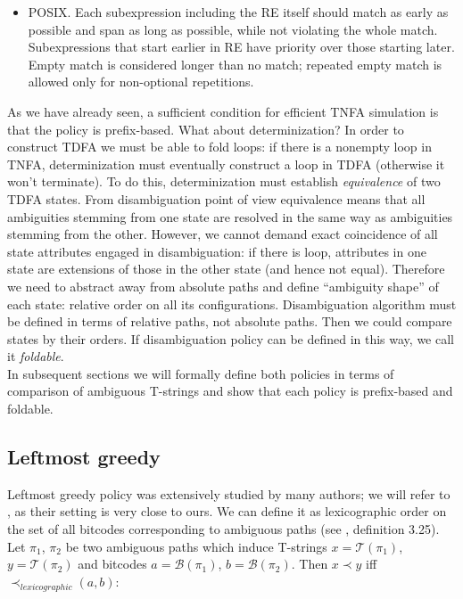\documentclass{article}
\newcommand{\Xeq}{\!=\!}
\newcommand{\XB}{\mathcal{B}}
\newcommand{\XT}{\mathcal{T}}
\theoremstyle{definition}
\begin{document}
\begin{multicols}{2}
\begin{itemize}
    \item POSIX.
        Each subexpression including the RE itself should match as early as possible
        and span as long as possible, while not violating the whole match.
        Subexpressions that start earlier in RE have priority over those starting later.
        Empty match is considered longer than no match;
        repeated empty match is allowed only for non-optional repetitions.
    \\
\end{itemize}

As we have already seen, a sufficient condition for efficient TNFA simulation is that the policy is prefix-based.
What about determinization?
In order to construct TDFA we must be able to fold loops:
if there is a nonempty loop in TNFA, determinization must eventually construct a loop in TDFA
(otherwise it won't terminate).
To do this, determinization must establish \emph{equivalence} of two TDFA states.
From disambiguation point of view equivalence means that all ambiguities stemming from one state
are resolved in the same way as ambiguities stemming from the other.
However, we cannot demand exact coincidence of all state attributes engaged in disambiguation:
if there is loop, attributes in one state are extensions of those in the other state (and hence not equal).
Therefore we need to abstract away from absolute paths and define ``ambiguity shape'' of each state: relative order on all its configurations.
Disambiguation algorithm must be defined in terms of relative paths, not absolute paths.
Then we could compare states by their orders.
If disambiguation policy can be defined in this way, we call it \emph{foldable}.
\\

In subsequent sections we will formally define both policies in terms of comparison of ambiguous T-strings
and show that each policy is prefix-based and foldable.

\subsection*{Leftmost greedy}

Leftmost greedy policy was extensively studied by many authors; we will refer to \cite{Gra15}, as their setting is very close to ours.
We can define it as lexicographic order on the set of all bitcodes corresponding to ambiguous paths
(see \cite{Gra15}, definition 3.25).
Let $\pi_1$, $\pi_2$ be two ambiguous paths which induce T-strings $x \Xeq \XT(\pi_1)$, $y \Xeq \XT(\pi_2)$
and bitcodes $a \Xeq \XB(\pi_1)$, $b \Xeq \XB(\pi_2)$.
Then $x \prec y$ iff $\prec_{lexicographic} (a, b)$:
\\


\end{multicols}
\end{document}
